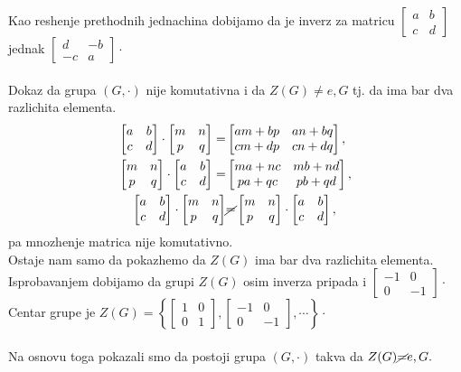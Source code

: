 \documentclass[11pt]{article}
\newcommand\eng{\fontencoding{OT1}\fontfamily{\rmdefault}\selectfont}
\newcommand\srb{\fontencoding{OT2}\fontfamily{\rmdefault}\selectfont}
\newcommand{\bm}{\begin{bmatrix}}
\newcommand{\enm}{\end{bmatrix}}
\begin{document}
Kao reshenje prethodnih jednachina dobijamo da je inverz za matricu $\bm a&b\\c&d \enm$ jednak $\bm d&-b\\-c&a \enm\cdot$\\\\
\eng{\textbf{II)}}\srb{} Dokaz da grupa $(G,\cdot)$ nije komutativna i da $Z(G)\not = e, G$ tj. da ima bar dva razlichita elementa.
\begin{align*}
\bm a&b\\c&d \enm\cdot\bm m&n\\p&q \enm =&\bm am+bp&an+bq\\cm+dp&cn+dq \enm,\\
\bm m&n\\p&q \enm\cdot\bm a&b\\c&d \enm =&\bm ma+nc&mb+nd\\pa+qc&pb+qd \enm,\\
\bm a&b\\c&d \enm\cdot\bm m&n\\p&q \enm&\cancel= \bm m&n\\p&q \enm\cdot\bm a&b\\c&d\enm,\\
\end{align*}pa mnozhenje matrica nije komutativno.\\
\newpage
Ostaje nam samo da pokazhemo da $Z(G)$ ima bar dva razlichita elementa.\\
Isprobavanjem dobijamo da grupi $Z(G)$ osim inverza pripada i $\bm -1&0\\0&-1\enm\cdot$\\
Centar grupe je $Z(G)=\left\{\bm 1&0\\0&1\enm ,\bm -1&0\\0&-1\enm,\cdots\right\}\cdot$\\\\
Na osnovu toga pokazali smo da postoji grupa $(G,\cdot)$ takva da $Z(G)\cancel{=}e,G.$
\end{document}
